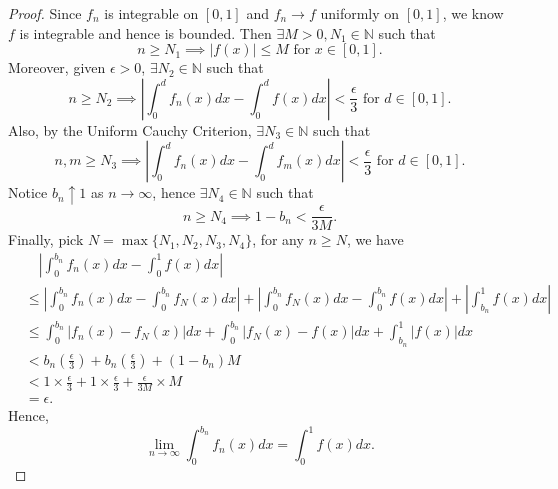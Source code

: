 \begin{Exercise}
\begin{proof}
Since $f_n$ is integrable on $[0,1]$ and $f_n\to f$ uniformly on $[0,1]$, we know $f$ is integrable and hence is bounded.
Then $\exists M > 0, N_1\in\mathbb{N}$ such that $$n\geq N_1 \implies \left| f(x) \right| \leq M \mbox{ for } x\in[0,1].$$
Moreover, given $\epsilon>0$, $\exists N_2\in\mathbb{N}$ such that $$n\geq N_2 \implies \left| \int_{0}^{d} f_n(x) d x - \int_{0}^{d} f(x) d x \right| < \frac{\epsilon}{3}\mbox{ for } d\in[0,1].$$
Also, by the Uniform Cauchy Criterion, $\exists N_3\in\mathbb{N}$ such that $$n,m\geq N_3 \implies \left| \int_{0}^{d} f_n(x) d x - \int_{0}^{d} f_m(x) d x \right| < \frac{\epsilon}{3}\mbox{ for } d\in[0,1].$$
Notice $b_n \uparrow 1$ as $n\to\infty$, hence $\exists N_4 \in\mathbb{N}$ such that $$n\geq N_4 \implies 1- b_n < \frac{\epsilon}{3M}.$$
Finally, pick $N = \max\{N_1,N_2,N_3,N_4\}$, for any $n\geq N$, we have
\begin{align*}
&\quad \left| \int_{0}^{b_n} f_n(x) d x - \int_{0}^{1} f(x) d x \right| \\
&\leq \left| \int_{0}^{b_n} f_n(x) d x - \int_{0}^{b_n} f_N(x) d x \right| + \left| \int_{0}^{b_n} f_N(x) d x - \int_{0}^{b_n} f(x) d x \right| + \left| \int_{b_n}^{1} f(x) d x \right| \\
&\leq \int_{0}^{b_n} \left| f_n(x) - f_N(x) \right| d x + \int_{0}^{b_n} \left| f_N(x) - f(x) \right| d x + \int_{b_n}^{1} |f(x)| d x \\
&< b_n\left( \frac{\epsilon}{3} \right) + b_n\left( \frac{\epsilon}{3} \right) +\left( 1-b_n \right) M \\
&< 1\times\frac{\epsilon}{3} + 1\times\frac{\epsilon}{3} +\frac{\epsilon}{3M}\times M \\
&= \epsilon.
\end{align*}
Hence, $$\lim_{n\to\infty}\int_{0}^{b_n} f_n(x) dx = \int_{0}^{1} f(x) dx.$$
\end{proof}
\end{Exercise}